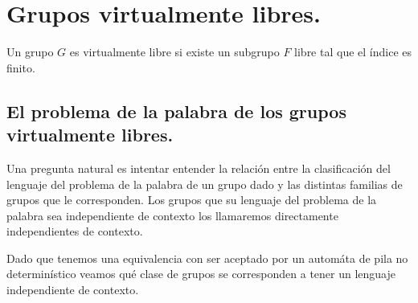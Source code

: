 \documentclass[tesis.tex]{subfiles}
\begin{document}
	
\chapter{Grupos virtualmente libres.}

Un grupo $G$ es virtualmente libre si existe un subgrupo $F$ libre tal que el índice es finito.





\section{El problema de la palabra de los grupos virtualmente libres.}
Una pregunta natural es intentar entender la relación entre la clasificación del lenguaje del problema de la palabra de un grupo dado y las distintas familias de grupos que le corresponden. Los grupos que su lenguaje del problema de la palabra sea independiente de contexto los llamaremos directamente independientes de contexto. 

Dado que tenemos una equivalencia con ser aceptado por un automáta de pila no determinístico veamos qué clase de grupos se corresponden a tener un lenguaje independiente de contexto.
\end{document}

